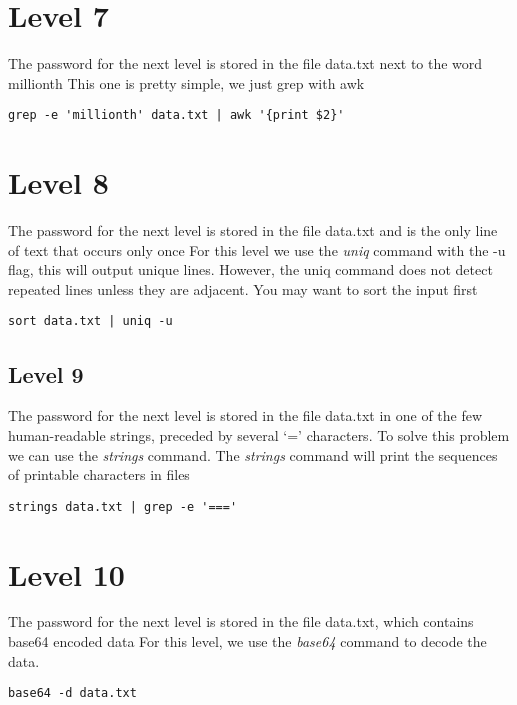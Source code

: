 \documentclass{report}
\begin{document}
    \pagebreak 
    \section*{Level 7}
    \bigbreak \noindent 
    The password for the next level is stored in the file data.txt next to the word millionth
    \bigbreak \noindent 
    This one is pretty simple, we just grep with awk
    \bigbreak \noindent 
    \begin{verbatim}
grep -e 'millionth' data.txt | awk '{print $2}'
    \end{verbatim}
    \bigbreak \noindent

    \bigbreak \noindent 
    \section*{Level 8}
    \bigbreak \noindent 
    The password for the next level is stored in the file data.txt and is the only line of text that occurs only once
    \bigbreak \noindent 
    For this level we use the \textit{uniq} command with the -u flag, this will output unique lines. However, the uniq command  does not detect repeated lines unless they are adjacent.  You may want to sort the input first
    \bigbreak \noindent 
    \begin{verbatim}
sort data.txt | uniq -u
    \end{verbatim}
    \bigbreak \noindent

    \bigbreak \noindent 
    \subsection*{Level 9}
    \bigbreak \noindent 
    The password for the next level is stored in the file data.txt in one of the few human-readable strings, preceded by several ‘=’ characters.
    \bigbreak \noindent 
    To solve this problem we can use the \textit{strings} command. The \textit{strings} command will print the sequences of printable characters in files
    \bigbreak \noindent 
    \begin{verbatim}
strings data.txt | grep -e '===' 
    \end{verbatim}
    \bigbreak \noindent

    \bigbreak \noindent 
    \section*{Level 10}
    \bigbreak \noindent 
    The password for the next level is stored in the file data.txt, which contains base64 encoded data
    \bigbreak \noindent 
    For this level, we use the \textit{base64} command to decode the data.
    \bigbreak \noindent 
    \begin{verbatim}
base64 -d data.txt
    \end{verbatim}
    \bigbreak \noindent
\end{document}
